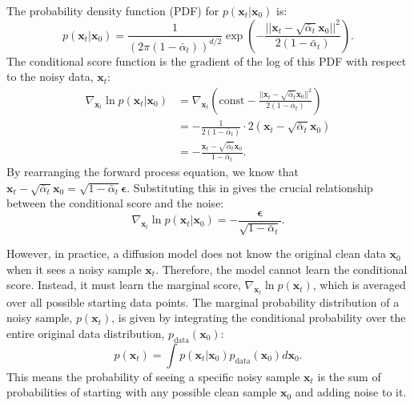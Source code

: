 \documentclass{article}
\begin{document}
The probability density function (PDF) for $p(\mathbf{x}_t | \mathbf{x}_0)$ is:
\begin{equation}
p(\mathbf{x}_t | \mathbf{x}_0) = \frac{1}{(2\pi(1 - \bar{\alpha}_t))^{d/2}} \exp\left(-\frac{||\mathbf{x}_t - \sqrt{\bar{\alpha}_t} \mathbf{x}_0||^2}{2(1 - \bar{\alpha}_t)}\right).
\end{equation}
The conditional score function is the gradient of the log of this PDF with respect to the noisy data, $\mathbf{x}_t$:
\begin{align}
\nabla_{\mathbf{x}_t} \ln p(\mathbf{x}_t | \mathbf{x}_0) &= \nabla_{\mathbf{x}_t} \left( \text{const} - \frac{||\mathbf{x}_t - \sqrt{\bar{\alpha}_t} \mathbf{x}_0||^2}{2(1 - \bar{\alpha}_t)} \right) \\
&= - \frac{1}{2(1 - \bar{\alpha}_t)} \cdot 2(\mathbf{x}_t - \sqrt{\bar{\alpha}_t} \mathbf{x}_0) \\
&= -\frac{\mathbf{x}_t - \sqrt{\bar{\alpha}_t} \mathbf{x}_0}{1 - \bar{\alpha}_t}.
\end{align}
By rearranging the forward process equation, we know that $\mathbf{x}_t - \sqrt{\bar{\alpha}_t} \mathbf{x}_0 = \sqrt{1 - \bar{\alpha}_t} \boldsymbol{\epsilon}$. Substituting this in gives the crucial relationship between the conditional score and the noise:
\begin{equation} \label{eq:conditional_score_noise}
\nabla_{\mathbf{x}_t} \ln p(\mathbf{x}_t | \mathbf{x}_0) = -\frac{\boldsymbol{\epsilon}}{\sqrt{1 - \bar{\alpha}_t}}.
\end{equation}

However, in practice, a diffusion model does not know the original clean data $\mathbf{x}_0$ when it sees a noisy sample $\mathbf{x}_t$. Therefore, the model cannot learn the conditional score. Instead, it must learn the marginal score, $\nabla_{\mathbf{x}_t} \ln p(\mathbf{x}_t)$, which is averaged over all possible starting data points.
The marginal probability distribution of a noisy sample, $p(\mathbf{x}_t)$, is given by integrating the conditional probability over the entire original data distribution, $p_{\text{data}}(\mathbf{x}_0)$:
\begin{equation}
p(\mathbf{x}_t) = \int p(\mathbf{x}_t | \mathbf{x}_0) p_{\text{data}}(\mathbf{x}_0) d\mathbf{x}_0.
\end{equation}
This means the probability of seeing a specific noisy sample $\mathbf{x}_t$ is the sum of probabilities of starting with any possible clean sample $\mathbf{x}_0$ and adding noise to it.
\end{document}
